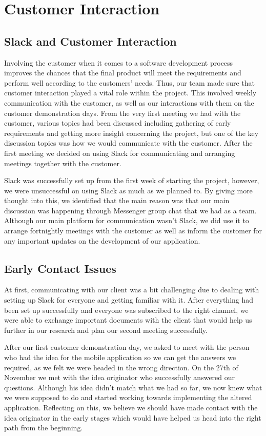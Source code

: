 \documentclass{l3proj}
\begin{document}
\section{Customer Interaction}
\label{sec: customer interaction}
\subsection{Slack and Customer Interaction}
\label{slack and customer interaction}
Involving the customer when it comes to a software development process improves the chances that the final product will meet the requirements and perform well according to the customers' needs. Thus, our team made sure that customer interaction played a vital role within the project. This involved weekly communication with the customer, as well as our interactions with them on the customer demonstration days. From the very first meeting we had with the customer, various topics had been discussed including gathering of early requirements and getting more insight concerning the project, but one of the key discussion topics was how we would communicate with the customer. After the first meeting we decided on using Slack for communicating and arranging meetings together with the customer.\par
Slack was successfully set up from the first week of starting the project, however, we were unsuccessful on using Slack as much as we planned to. By giving more thought into this, we identified that the main reason was that our main discussion was happening through Messenger group chat that we had as a team. Although our main platform for communication wasn't Slack, we did use it to arrange fortnightly meetings with the customer as well as inform the customer for any important updates on the development of our application.\par
\subsection{Early Contact Issues}
\label{early contact issues}
At first, communicating with our client was a bit challenging due to dealing with setting up Slack for everyone and getting familiar with it. After everything had been set up successfully and everyone was subscribed to the right channel, we were able to exchange important documents with the client that would help us further in our research and plan our second meeting successfully. \par
After our first customer demonstration day, we asked to meet with the person who had the idea for the mobile application so we can get the answers we required, as we felt we were headed in the wrong direction. On the 27th of November we met with the idea originator who successfully answered our questions. Although his idea didn't match what we had so far, we now knew what we were supposed to do and started working towards implementing the altered application. Reflecting on this, we believe we should have made contact with the idea originator in the early stages which would have helped us head into the right path from the beginning. \par
\end{document}
